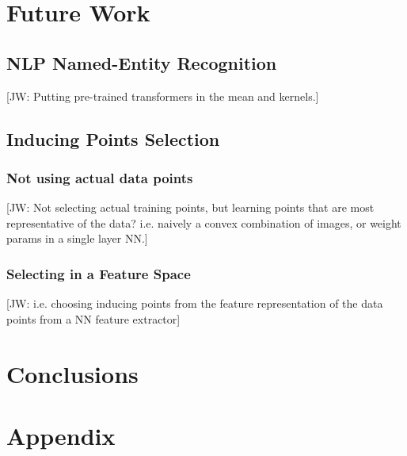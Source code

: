 \documentclass{article}
\newcommand{\jw}[1]{{\color{gray} [JW: #1]}}
\numberwithin{equation}{section}
\begin{document}
\newpage
\section{Future Work}
\subsection{NLP Named-Entity Recognition}
\jw{Putting pre-trained transformers in the mean and kernels.} 


\subsection{Inducing Points Selection}
\subsubsection{Not using actual data points}
\jw{Not selecting actual training points, but learning points that are most representative of the data? i.e. naively a convex combination of images, or weight params in a single layer NN.}
\subsubsection{Selecting in a Feature Space}
\jw{i.e. choosing inducing points from the feature representation of the data points from a NN feature extractor}


\newpage
\section{Conclusions}

\newpage



\newpage
\appendix
\section{Appendix}
\end{document}
